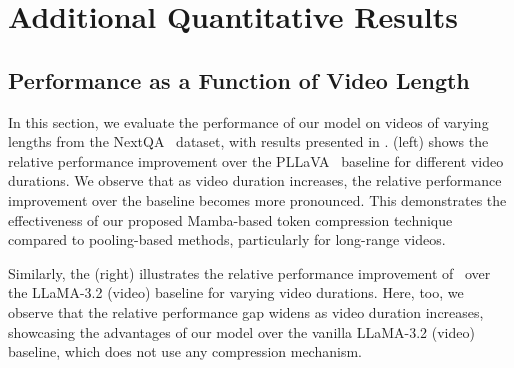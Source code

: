 \section{Additional Quantitative Results}
\label{sec:additional quantitative}

\subsection{Performance as a Function of Video Length}


In this section, we evaluate the performance of our model on videos of varying lengths from the NextQA~\cite{xiao2021nextqa} dataset, with results presented in .  (left) shows the relative performance improvement over the PLLaVA~\cite{xu2024pllavaparameterfreellava} baseline for different video durations. We observe that as video duration increases, the relative performance improvement over the baseline becomes more pronounced. This demonstrates the effectiveness of our proposed Mamba-based token compression technique compared to pooling-based methods, particularly for long-range videos.


Similarly, the   (right) illustrates the relative performance improvement of \modelLlava\ over the LLaMA-3.2 (video) baseline for varying video durations. Here, too, we observe that the relative performance gap widens as video duration increases, showcasing the advantages of our model over the vanilla LLaMA-3.2 (video) baseline, which does not use any compression mechanism.



